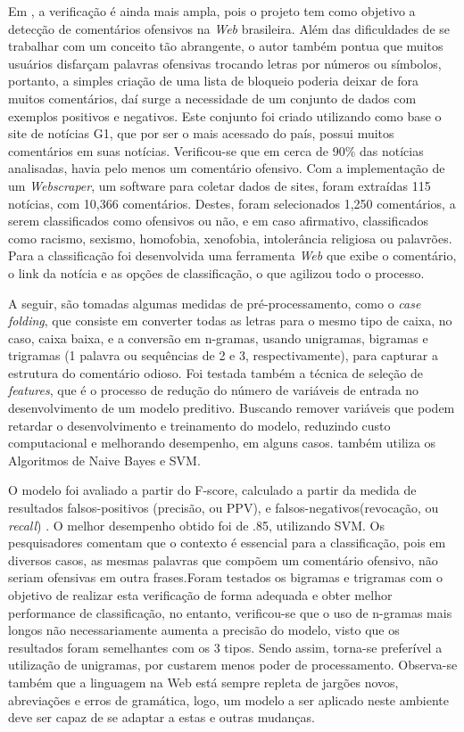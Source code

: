 Em \textcite{de2017offensive}, a verificação é ainda mais ampla, pois o projeto tem como objetivo a detecção de comentários ofensivos na \textit{Web} brasileira. Além das dificuldades de se trabalhar com um conceito tão abrangente, o autor também pontua que muitos usuários disfarçam palavras ofensivas trocando letras por números ou símbolos, portanto, a simples criação de uma lista de bloqueio poderia deixar de fora muitos comentários, daí surge a necessidade de um conjunto de dados com exemplos positivos e negativos. Este conjunto foi criado utilizando como base o site de notícias G1, que por ser o mais acessado do país, possui muitos comentários em suas notícias. Verificou-se que em cerca de 90\% das notícias analisadas, havia pelo menos um comentário ofensivo. Com a implementação de um \textit{Webscraper}, um software para coletar dados de sites, foram extraídas 115 notícias, com 10,366 comentários. Destes, foram selecionados 1,250 comentários, a serem classificados como ofensivos ou não, e em caso afirmativo, classificados como racismo, sexismo, homofobia, xenofobia, intolerância religiosa ou palavrões. Para a classificação foi desenvolvida uma ferramenta \textit{Web} que exibe o comentário, o link da notícia e as opções de classificação, o que agilizou todo o processo.

A seguir, são tomadas algumas medidas de pré-processamento, como o \textit{case folding}, que consiste em converter todas as letras para o mesmo tipo de caixa, no caso, caixa baixa, e a conversão em n-gramas, usando unigramas, bigramas e trigramas (1 palavra ou sequências de 2 e 3, respectivamente), para capturar a estrutura do comentário odioso. Foi testada também a técnica de seleção de \textit{features}, que é o processo de redução do número de variáveis de entrada no desenvolvimento de um modelo preditivo. Buscando remover variáveis que podem retardar o desenvolvimento e treinamento do modelo, reduzindo custo computacional e melhorando desempenho, em alguns casos. \textcite{de2017offensive} também utiliza os Algoritmos de Naive Bayes e SVM.

O modelo foi avaliado a partir do F-score,  calculado a partir da medida de resultados falsos-positivos (precisão, ou PPV), e falsos-negativos(revocação, ou \textit{recall}) \textcite{avaliacao-modelo}. O melhor desempenho obtido foi de .85, utilizando SVM. Os pesquisadores comentam que o contexto é essencial para a classificação, pois em diversos casos, as mesmas palavras que compõem um comentário ofensivo, não seriam ofensivas em outra frases.Foram testados os bigramas e trigramas com o objetivo de realizar esta verificação de forma adequada e obter melhor performance de classificação, no entanto, verificou-se que o uso de n-gramas mais longos não necessariamente aumenta a precisão do modelo, visto que os resultados foram semelhantes com os 3 tipos. Sendo assim, torna-se preferível a utilização de unigramas, por custarem menos poder de processamento. Observa-se também que a linguagem na Web está sempre repleta de jargões novos, abreviações e erros de gramática, logo, um modelo a ser aplicado neste ambiente deve ser capaz de se adaptar a estas e outras mudanças.

